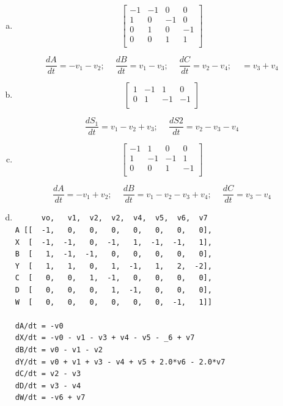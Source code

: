 \documentclass[12pt]{article}
\begin{document}
\cprotEnv\begin{solution}
\begin{enumerate}[a)]
\item
\begin{equation*}
       \left[ \begin{array}{rrrr}
         -1 & -1 &   0 & 0 \\
          1 & 0  &  -1 & 0 \\
          0 & 1  &   0 & -1 \\
          0 & 0  &   1 & 1 \\
       \end{array} \right]
\end{equation*}

$$\frac{dA}{dt} =  -v_1 - v_2;\ \quad \frac{dB}{dt} = v_1 - v_3;\ \quad \frac{dC}{dt} = v_2 - v_4; \quad \frac{}{} = v_3 + v_4 $$

\item
\begin{equation*}
       \left[ \begin{array}{rrrr}
         1 & -1 &  1 & 0 \\
         0 & 1  &  -1 & -1 \\
       \end{array} \right]
\end{equation*}

$$\frac{dS_1}{dt} = v_1 - v_2 + v_3;\ \quad \frac{dS2}{dt} = v_2 - v_3 - v_4 $$

\item
\begin{equation*}
       \left[ \begin{array}{rrrr}
         -1 & 1  &  0 & 0 \\
          1 & -1 & -1 & 1 \\
          0 & 0  &  1 & -1 \\
       \end{array} \right]
\end{equation*}

$$\frac{dA}{dt} =  -v_1 + v_2;\ \quad \frac{dB}{dt} = v_1 - v_2 - v_3 + v_4;\ \quad \frac{dC}{dt} = v_3 - v_4 $$

\item
\begin{verbatim}
      vo,   v1,  v2,  v2,  v4,  v5,  v6,  v7
A [[  -1,   0,   0,   0,   0,   0,   0,   0],
X  [  -1,  -1,   0,  -1,   1,  -1,  -1,   1],
B  [   1,  -1,  -1,   0,   0,   0,   0,   0],
Y  [   1,   1,   0,   1,  -1,   1,   2,  -2],
C  [   0,   0,   1,  -1,   0,   0,   0,   0],
D  [   0,   0,   0,   1,  -1,   0,   0,   0],
W  [   0,   0,   0,   0,   0,   0,  -1,   1]]

dA/dt = -v0
dX/dt = -v0 - v1 - v3 + v4 - v5 - _6 + v7
dB/dt = v0 - v1 - v2
dY/dt = v0 + v1 + v3 - v4 + v5 + 2.0*v6 - 2.0*v7
dC/dt = v2 - v3
dD/dt = v3 - v4
dW/dt = -v6 + v7
\end{verbatim}
\end{enumerate}

\end{solution}
\end{document}
